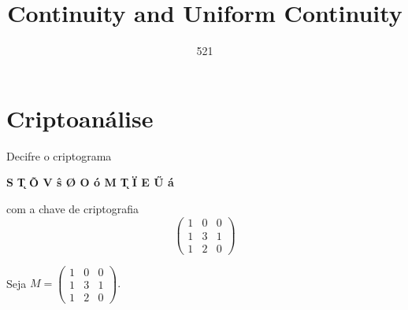 \documentclass[oneside,a4paper,12pt]{article}
\newcommand{\AS}[1]{{\fontencoding{T4}\selectfont#1}}
\theoremstyle{definition}
\theoremstyle{plain}
\theoremstyle{solu}
\theoremstyle{dotlessP}
\begin{document}
	

	
\title{Continuity and Uniform Continuity}
\author{521}
\newpage
\tableofcontents


\newpage

\section{Criptoanálise}

Decifre o criptograma 
\begin{center}
\textbf{S \k{T} \~{O} V \^{s} \AS{\O} O \AS{} ó M \k{T} \"{I} E \H{U} á}
\end{center}

com a chave de criptografia
\[
\begin{pmatrix}
1 & 0 & 0 \\
1 & 3 & 1 \\
1 & 2 & 0
\end{pmatrix}
\]

Seja $M = \begin{pmatrix}
1 & 0 & 0 \\
1 & 3 & 1 \\
1 & 2 & 0
\end{pmatrix}.$ 
\end{document}
